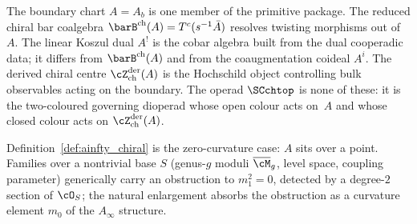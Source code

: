 \begin{remark}
\label{rem:five-primitive-objects-axioms}
The boundary chart $A=A_b$ is one member of the primitive package.
The reduced chiral bar coalgebra
$\barB^{\mathrm{ch}}(A)=T^c(s^{-1}\bar A)$ resolves twisting morphisms
out of~$A$. The linear Koszul dual $A^!$ is the cobar algebra built
from the dual cooperadic data; it differs from $\barB^{\mathrm{ch}}(A)$
and from the coaugmentation coideal $A^i$. The derived chiral centre
$\cZ^{\mathrm{der}}_{\mathrm{ch}}(A)$ is the Hochschild object
controlling bulk observables acting on the boundary. The operad
$\SCchtop$ is none of these: it is the two-coloured governing
dioperad whose open colour acts on~$A$ and whose closed colour acts
on $\cZ^{\mathrm{der}}_{\mathrm{ch}}(A)$.
\end{remark}

Definition~\ref{def:ainfty_chiral} is the zero-curvature case: $A$
sits over a point. Families over a nontrivial base $S$ (genus-$g$
moduli $\overline{\cM}_g$, level space, coupling parameter)
generically carry an obstruction to $m_1^2 = 0$, detected by a
degree-$2$ section of $\cO_S$; the natural enlargement absorbs the
obstruction as a curvature element $m_0$ of the $A_\infty$
structure.

